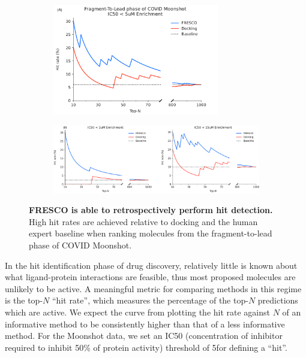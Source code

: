 \begin{figure}[!th]
    \centering
   
    \begin{subfigure}{\textwidth}
    \centering
    \includegraphics[width=0.8\textwidth]{Chapters/Fresco/Figs/fresco_vs_moonshot_break_5uM.pdf}
    \end{subfigure}
    \hfill
   
    \begin{subfigure}{\textwidth}
    \centering
    \includegraphics[width=1.0\textwidth]{Chapters/Fresco/Figs/fresco_sensitivity.png}
    \end{subfigure}
    \caption{\textbf{FRESCO is able to retrospectively perform hit detection.} High hit rates are achieved relative to docking and the human expert baseline when ranking molecules from the fragment-to-lead phase of COVID Moonshot.}
    \label{fig:moonshot_enrichment_vs_docking}
\end{figure}

In the hit identification phase of drug discovery, relatively little is known about what ligand-protein interactions are feasible, thus most proposed molecules are unlikely to be active. A meaningful metric for comparing methods in this regime is the top-$N$ ``hit rate'', which measures the percentage of the top-$N$ predictions which are active. We expect the curve from plotting the hit rate against $N$ of an informative method to be consistently higher than that of a less informative method. For the Moonshot data, we set an IC50 (concentration of inhibitor required to inhibit 50\% of protein activity) threshold of 5\uM for defining a ``hit''.

